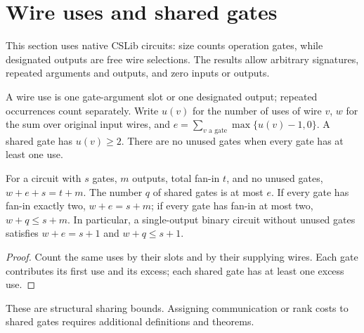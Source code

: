 \section{Wire uses and shared gates}
\label{sec:circuits-sharing}

This section uses native CSLib circuits: size counts operation gates, while
designated outputs are free wire selections. The results allow arbitrary
signatures, repeated arguments and outputs, and zero inputs or outputs.

\begin{definition}
  \label{def:circuits-wire-uses}
  \leanok
  A wire use is one gate-argument slot or one designated output; repeated
  occurrences count separately. Write $u(v)$ for the number of uses of wire
  $v$, $w$ for the sum over original input wires, and
  $e=\sum_{v\text{ a gate}}\max\{u(v)-1,0\}$. A shared gate has $u(v)\ge2$.
  There are no unused gates when every gate has at least one use.
\end{definition}

\begin{theorem}
  \label{thm:circuits-wire-use-budget}
  \leanok
  For a circuit with $s$ gates, $m$ outputs, total fan-in $t$, and no unused
  gates, $w+e+s=t+m$. The number $q$ of shared gates is at most $e$.
  If every gate has fan-in exactly two, $w+e=s+m$; if every gate has
  fan-in at most two, $w+q\le s+m$. In particular, a single-output binary
  circuit without unused gates satisfies $w+e=s+1$ and $w+q\le s+1$.
\end{theorem}
\begin{proof}
  \leanok
  Count the same uses by their slots and by their supplying wires. Each
  gate contributes its first use and its excess; each shared gate has
  at least one excess use.
\end{proof}

These are structural sharing bounds. Assigning communication or rank costs
to shared gates requires additional definitions and theorems.

